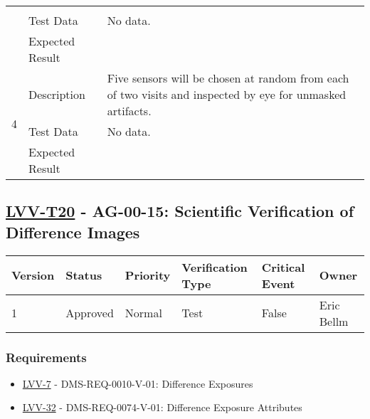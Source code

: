 \begin{longtable}[]{p{1.3cm}p{2cm}p{13cm}}
\begin{minipage}[t]{13cm}
{            \vspace{\dp0}
            } \end{minipage} \\ \cline{2-3}
            & Test Data &
            \begin{minipage}[t]{13cm}{\footnotesize
                No data.
                \vspace{\dp0}
            } \end{minipage} \\ \cline{2-3}
            & Expected Result &
        \\ \midrule

            \multirow{3}{*}{ 4 } & Description &
            \begin{minipage}[t]{13cm}{\footnotesize
            Five sensors will be chosen at random from each of two visits and
inspected by eye for unmasked artifacts.

            \vspace{\dp0}
            } \end{minipage} \\ \cline{2-3}
            & Test Data &
            \begin{minipage}[t]{13cm}{\footnotesize
                No data.
                \vspace{\dp0}
            } \end{minipage} \\ \cline{2-3}
            & Expected Result &
        \\ \midrule
    \end{longtable}

\subsection{\href{https://jira.lsstcorp.org/secure/Tests.jspa\#/testCase/LVV-T20}{LVV-T20}
    - AG-00-15: Scientific Verification of Difference Images}\label{lvv-t20}

\begin{longtable}[]{llllll}
\toprule
Version & Status & Priority & Verification Type & Critical Event & Owner
\\\midrule
1 & Approved & Normal &
Test & False & Eric Bellm
\\\bottomrule
\end{longtable}

\subsubsection{Requirements}
\begin{itemize}
\item \href{https://jira.lsstcorp.org/browse/LVV-7}{LVV-7} - DMS-REQ-0010-V-01: Difference Exposures
\item \href{https://jira.lsstcorp.org/browse/LVV-32}{LVV-32} - DMS-REQ-0074-V-01: Difference Exposure Attributes
\end{itemize}

